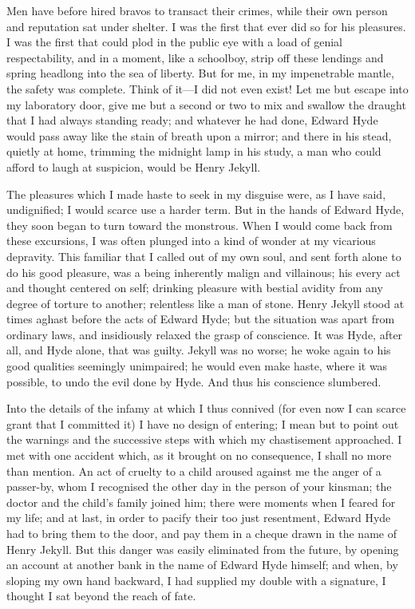 \documentclass[12pt,openright]{book}
\begin{document}
Men have before hired bravos to transact their crimes, while their own person and reputation sat under shelter. I was the first that ever did so for his pleasures. I was the first that could plod in the public eye with a load of genial respectability, and in a moment, like a schoolboy, strip off these lendings and spring headlong into the sea of liberty. But for me, in my impenetrable mantle, the safety was complete. Think of it—I did not even exist! Let me but escape into my laboratory door, give me but a second or two to mix and swallow the draught that I had always standing ready; and whatever he had done, Edward Hyde would pass away like the stain of breath upon a mirror; and there in his stead, quietly at home, trimming the midnight lamp in his study, a man who could afford to laugh at suspicion, would be Henry Jekyll.

The pleasures which I made haste to seek in my disguise were, as I have said, undignified; I would scarce use a harder term. But in the hands of Edward Hyde, they soon began to turn toward the monstrous. When I would come back from these excursions, I was often plunged into a kind of wonder at my vicarious depravity. This familiar that I called out of my own soul, and sent forth alone to do his good pleasure, was a being inherently malign and villainous; his every act and thought centered on self; drinking pleasure with bestial avidity from any degree of torture to another; relentless like a man of stone. Henry Jekyll stood at times aghast before the acts of Edward Hyde; but the situation was apart from ordinary laws, and insidiously relaxed the grasp of conscience. It was Hyde, after all, and Hyde alone, that was guilty. Jekyll was no worse; he woke again to his good qualities seemingly unimpaired; he would even make haste, where it was possible, to undo the evil done by Hyde. And thus his conscience slumbered.

Into the details of the infamy at which I thus connived (for even now I can scarce grant that I committed it) I have no design of entering; I mean but to point out the warnings and the successive steps with which my chastisement approached. I met with one accident which, as it brought on no consequence, I shall no more than mention. An act of cruelty to a child aroused against me the anger of a passer-by, whom I recognised the other day in the person of your kinsman; the doctor and the child’s family joined him; there were moments when I feared for my life; and at last, in order to pacify their too just resentment, Edward Hyde had to bring them to the door, and pay them in a cheque drawn in the name of Henry Jekyll. But this danger was easily eliminated from the future, by opening an account at another bank in the name of Edward Hyde himself; and when, by sloping my own hand backward, I had supplied my double with a signature, I thought I sat beyond the reach of fate.
\end{document}
